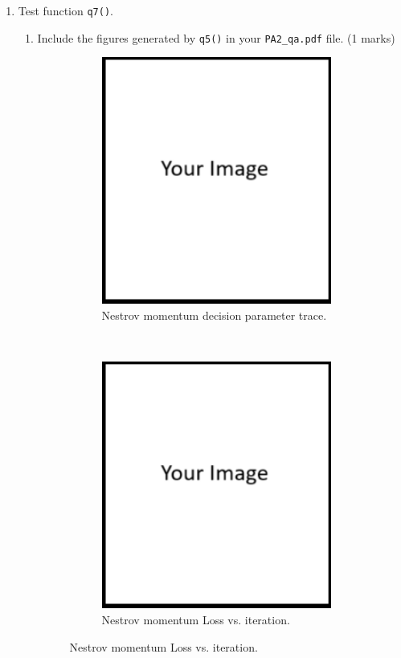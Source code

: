 \documentclass{article}
\theoremstyle{definition}
\begin{document}
\begin{enumerate}[label=\ref{mom}.\alph*]
\begin{enumerate}[label=1.2.b.\roman*]
\begin{figure}[h]
\begin{subfigure}[t]{0.5\textwidth}
				\caption{Heavy-ball momentum Loss vs. iteration.}
			\end{subfigure}
			\caption{Figures generated by q6().}
		\end{figure}
	\end{enumerate}
	\newpage
	\item Test function \verb|q7()|.
	\begin{enumerate}[label=1.2.c.\roman*]
		\item Include the figures generated by \verb|q5()| in your \verb|PA2_qa.pdf| file. (1 marks)
		\begin{figure}[h]
			\centering
			\begin{subfigure}[t]{0.5\textwidth}
				\centering
				\includegraphics[height=3.2in]{image.png}
				\caption{Nestrov momentum decision parameter trace.}
			\end{subfigure}%
			~ 
			\begin{subfigure}[t]{0.5\textwidth}
				\centering
				\includegraphics[height=3.2in]{image.png}
				\caption{Nestrov momentum Loss vs. iteration.}

\end{subfigure}
\end{figure}
\end{enumerate}
\end{enumerate}
\end{document}
